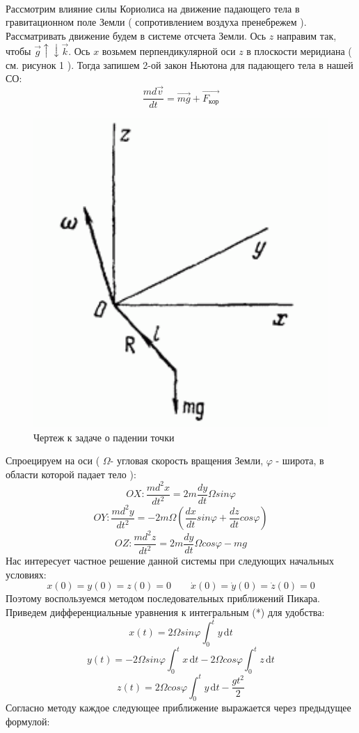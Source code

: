 \documentclass[a4paper, 12pt]{article}
\begin{document}
\paragraph{}
Рассмотрим влияние силы Кориолиса на движение падающего тела в гравитационном поле Земли ( сопротивлением воздуха пренебрежем ). Рассматривать движение будем в системе отсчета Земли. Ось $z$ направим так, чтобы $\overrightarrow{g} \uparrow \downarrow \overrightarrow{k}$. Ось $x$ возьмем перпендикулярной оси $z$ в плоскости меридиана ( см. рисунок 1 ). Тогда запишем 2-ой закон Ньютона для падающего тела в нашей СО:
\[ \frac{m d\overrightarrow{v}}{dt} = \overrightarrow{mg} + \overrightarrow{F_{кор}}\]
\newpage
\begin{figure}[h]

\centering

\includegraphics[width=0.4\linewidth]{Koriolis.png}

\caption{Чертеж к задаче о падении точки}

\label{fig:mpr}

\end{figure}
Спроецируем на оси ( $\Omega$- угловая скорость вращения Земли, $\varphi$ - широта, в области которой падает тело ):
\[ OX: \frac{m d^2 x}{dt^2} = 2m \frac{dy}{dt} \Omega sin\varphi\]
\[ OY: \frac{m d^2 y}{dt^2} = - 2m\Omega ( \frac{dx}{dt} sin\varphi + \frac{dz}{dt} cos\varphi)\]
\[ OZ: \frac{m d^2 z}{dt^2} = 2m \frac{dy}{dt} \Omega cos\varphi - mg\] 
Нас интересует частное решение данной системы при следующих начальных условиях:
\[ x(0) = y(0) = z(0) = 0 \qquad
\dot{x}(0) = \dot{y}(0) = \dot{z}(0) = 0\]
Поэтому воспользуемся методом последовательных приближений Пикара. Приведем дифференциальные уравнения к интегральным (*) для удобства:
\[ x(t) = 2\Omega sin\varphi \int_0^t y\,\mathrm{d}t \]
\[ y(t) = -2\Omega sin\varphi \int_0^t x\,\mathrm{d}t -2\Omega cos\varphi \int_0^t z\,\mathrm{d}t \]
\[ z(t) = 2\Omega cos\varphi \int_0^t y\,\mathrm{d}t - \frac{g t^2}{2} \]
Согласно методу каждое следующее приближение выражается через предыдущее формулой: 
\end{document}
